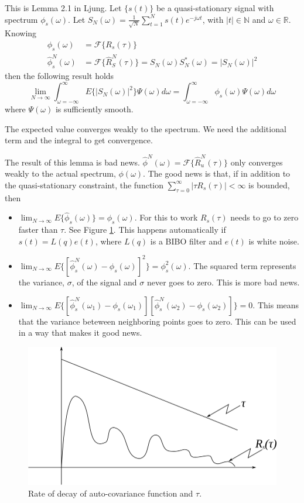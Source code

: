 \documentclass[lecture,12pt,]{pcms-l}
\theoremstyle{example}
\newcommand{\fint}{\int_{\omega=-\infty}^\infty}
\newcommand{\w}{\omega}
\begin{document}
\begin{lemma}
This is Lemma 2.1 in Ljung. Let $\{s(t)\}$ be a quasi-stationary signal with spectrum $\phi_s(\w)$. Let $S_N(\w) = \frac{1}{\sqrt{N}} \sum_{t=1}^N s(t)e^{-j\w t}$, with $|t|\in\mathbb{N}$ and $\w\in\mathbb{R}$. Knowing
\begin{align*}
\phi_s(\w) &= \mathcal{F}\{R_s(\tau)\} \\
\hat{\phi}_s^N(\w) &= \mathcal{F}\{\hat{R}_S^N(\tau)\} = S_N(\w)S_N^*(\w) = |S_N(\w)|^2
\end{align*}
then the following result holds
$$\lim_{N\to\infty} \fint E\{|S_N(\w)|^2\}\Psi(\w)d\w = \fint \phi_s(\w)\Psi(\w)d\w$$
where $\Psi(\w)$ is sufficiently smooth.
\end{lemma}
The expected value converges weakly to the spectrum. We need the additional term and the integral to get convergence.

The result of this lemma is bad news. $\hat{\phi}^N(\w) = \mathcal{F}\{\hat{R}_u^N(\tau)\}$ only converges weakly to the actual spectrum, $\phi(\w)$. The good news is that, if in addition to the quasi-stationary constraint, the function $\sum_{\tau=0}^\infty|\tau R_s(\tau)|<\infty$ is bounded, then
\begin{itemize}
\item $\lim_{N\to\infty}E\{\hat{\phi}_s(\w)\} = \phi_s(\w)$. For this to work $R_s(\tau)$ needs to go to zero faster than $\tau$. See Figure \ref{fig:06autoCovDecay}. This happens automatically if $s(t)=L(q)e(t)$, where $L(q)$ is a BIBO filter and $e(t)$ is white noise.
\item $\lim_{N\to\infty}E\{[\hat{\phi}_s^N(\w)-\phi_s(\w)]^2\} = \phi_s^2(\w)$. The squared term represents the variance, $\sigma$, of the signal and $\sigma$ never goes to zero. This is more bad news.
\item $\lim_{N\to\infty}E\{[\hat{\phi}_s^N(\w_1)-\phi_s(\w_1)][\hat{\phi}_s^N(\w_2)-\phi_s(\w_2)]\} = 0$. This means that the variance beteween neighboring points goes to zero. This can be used in a way that makes it good news.
\end{itemize}

\begin{figure}[ht!]
	\centering
	\includegraphics[width=.4\textwidth]{images/06autoCovDecay}
	\caption{Rate of decay of auto-covariance function and $\tau$.}
	\label{fig:06autoCovDecay}
\end{figure}
\end{document}
